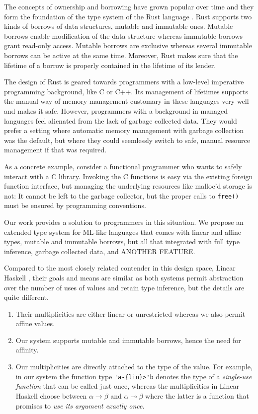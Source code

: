 The concepts of ownership and borrowing have grown popular over time
and they form the foundation of the type system of the Rust language
\cite{rust}. Rust supports two kinds of borrows of data structures, mutable and immutable
ones. Mutable borrows enable modification of the data structure
whereas immutable borrows grant read-only access. Mutable borrows are
exclusive whereas several immutable borrows can be active at the same
time. Moreover, Rust makes sure that the lifetime of a
borrow is properly contained in the lifetime of its lender. 

The design of Rust is geared towards programmers with a low-level
imperative programming background, like C or C++. Its management of
lifetimes supports the manual way of memory management customary in
these languages very well and makes it safe. However, programmers with
a background in managed languages feel alienated from the lack of garbage
collected data. They would prefer a setting where automatic memory
management with garbage collection was the default, but where they
could seemlessly switch to safe, manual resource management if that
was required.

As a concrete example, consider a functional programmer who wants to
safely interact with a C library. Invoking the C functions is easy via
the existing foreign function interface, but managing the underlying
resources like malloc'd storage is not: It cannot be left to the
garbage collector, but the proper calls to \texttt{free()} must be
ensured by programming conventions.

Our work provides a solution to programmers in this situation. We
propose an extended type system for ML-like languages that comes with
linear and affine types, mutable and immutable borrows, but all that
integrated with full type inference, garbage collected data, and
ANOTHER FEATURE.

Compared to the most closely related contender in this design space, Linear Haskell
\cite{DBLP:journals/pacmpl/BernardyBNJS18}, their goals and means are
similar as both systems permit abstraction over the number of uses of
values and retain type inference, but the details are quite different.
\begin{enumerate}
\item Their multiplicities are either linear or unrestricted whereas
  we also permit affine values.
\item Our system supports mutable and immutable borrows, hence the
  need for affinity.
\item Our multiplicities are directly attached to the type of the
  value. For example, in our system the function type \lstinline/'a-{lin}>'b/
  denotes the type of a \emph{single-use function} that can be called
  just once, whereas the multiplicities in Linear Haskell choose
  between $\alpha\to\beta$ and $\alpha \multimap\beta$ where the
  latter is a function that promises to \emph{use its argument exactly once}.
\end{enumerate}
